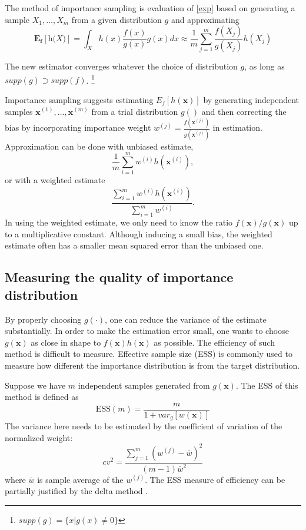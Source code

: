 \documentclass[times, utf8, diplomski]{fer}
\begin{document}
The method of importance sampling is evaluation of \ref{exp} based on generating a sample $X_1, \ldots, X_m$ from a given distribution $\textit{g}$ and approximating 
\begin{equation*}
\mathbf{E_f[\textit{h(X)}]} = \int_{X} h(x) \frac{f(x)}{g(x)} g(x) dx \approx \frac{1}{m} \sum_{j = 1}^{m} \frac{f(X_j)}{g(X_j)} h(X_j)
\end{equation*}

The new estimator converges whatever the choice of distribution $g$, as long as $supp(g) \supset supp(f)$. \footnote{$supp(g) = \{x | g(x) \neq 0\}$}

Importance sampling suggests estimating $E_f[h(\mathbf{x})]$ by generating independent samples $\mathbf{x}^{(1)}, \ldots, \mathbf{x}^{(m)}$ from a trial distribution $g( )$ and then correcting the bias by incorporating importance weight $w^{(j)} = \frac{f(\mathbf{x}^{(j)})}{g(\mathbf{x}^{(j)})}$ in estimation. Approximation can be done with unbiased estimate,
\begin{equation}
\frac{1}{m}\sum_{i=1}^{m}w^{(i)}h(\mathbf{x}^{(i)}),
\end{equation}
or with a weighted estimate
\begin{equation}
\frac{\sum_{i=1}^{m}w^{(i)}h(\mathbf{x}^{(i)})}{ \sum_{i=1}^{m}w^{(i)}}.
\label{wei_est}
\end{equation}
In using the weighted estimate, we only need to know the ratio $f(\mathbf{x})/g(\mathbf{x})$ up to a multiplicative constant. Although inducing a small bias, the weighted estimate often has a smaller mean squared error than the unbiased one.

\subsection{Measuring the quality of importance distribution}
By properly choosing $g(\cdot)$, one can reduce the variance of the estimate substantially. In order to make the estimation error small, one wants to choose $g(\mathbf{x})$ as close in shape to $f(\mathbf{x})h(\mathbf{x})$ as possible. The efficiency of such method is difficult to measure. Effective sample size (ESS) is commonly used to measure how different the importance distribution is from the target  distribution. 

Suppose we have $m$ independent samples generated from $g(\mathbf{x})$. The ESS of this method is defined as 
\begin{equation*}
\text{ESS}(m) = \frac{m}{1 + var_g[w(\mathbf{x})]}
\end{equation*}  
The variance here needs to be estimated by the coefficient of variation of the normalized weight:
\begin{equation*}
cv^2 = \frac{\sum_{j=1}^{m} (w^{(j)} - \bar{w})^2}{(m - 1)\bar{w}^2}
\end{equation*}
where $\bar{w}$ is sample average of the $w^{(j)}$. The ESS measure of efficiency can be partially justified by the delta method \cite{Liu}.
\end{document}
